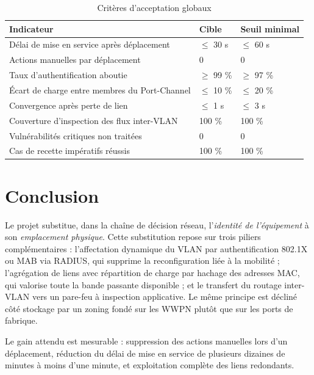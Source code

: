 \documentclass[11pt,a4paper]{article}
\begin{document}
\begin{table}[H]
\centering
\caption{Critères d'acceptation globaux}
\begin{tabularx}{\textwidth}{Y C{3.0cm} C{3.0cm}}
\toprule
{}\textbf{Indicateur} & \textbf{Cible} & \textbf{Seuil minimal} \\
\midrule
Délai de mise en service après déplacement & $\leq$ 30 s & $\leq$ 60 s \\
Actions manuelles par déplacement & 0 & 0 \\
Taux d'authentification aboutie & $\geq$ 99 \% & $\geq$ 97 \% \\
Écart de charge entre membres du Port-Channel & $\leq$ 10 \% & $\leq$ 20 \% \\
Convergence après perte de lien & $\leq$ 1 s & $\leq$ 3 s \\
Couverture d'inspection des flux inter-VLAN & 100 \% & 100 \% \\
Vulnérabilités critiques non traitées & 0 & 0 \\
Cas de recette impératifs réussis & 100 \% & 100 \% \\
\bottomrule
\end{tabularx}
\end{table}

\section{Conclusion}
Le projet substitue, dans la chaîne de décision réseau, l'\emph{identité de l'équipement} à son \emph{emplacement physique}. Cette substitution repose sur trois piliers complémentaires : l'affectation dynamique du VLAN par authentification 802.1X ou MAB via RADIUS, qui supprime la reconfiguration liée à la mobilité ; l'agrégation de liens avec répartition de charge par hachage des adresses MAC, qui valorise toute la bande passante disponible ; et le transfert du routage inter-VLAN vers un pare-feu à inspection applicative. Le même principe est décliné côté stockage par un zoning fondé sur les WWPN plutôt que sur les ports de fabrique.

Le gain attendu est mesurable : suppression des actions manuelles lors d'un déplacement, réduction du délai de mise en service de plusieurs dizaines de minutes à moins d'une minute, et exploitation complète des liens redondants.
\end{document}
